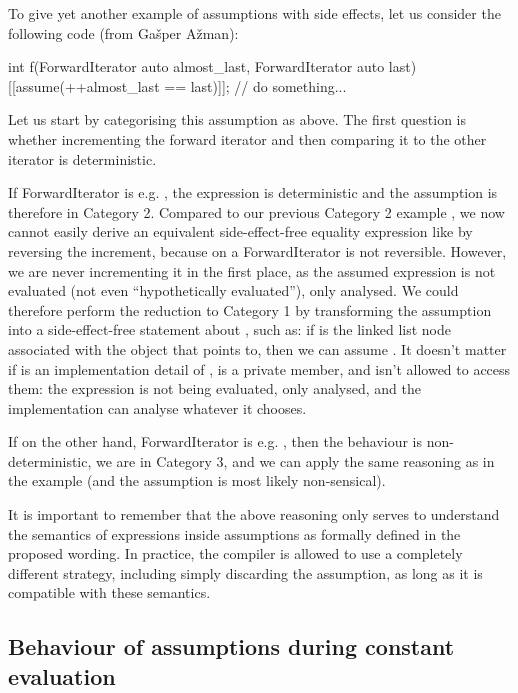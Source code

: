 To give yet another example of assumptions with side effects, let us consider the following code (from Ga\v sper A\v zman):

\begin{codeblock}
int f(ForwardIterator auto almost_last, ForwardIterator auto last) {
  [[assume(++almost_last == last)]];
  // do something...
}
\end{codeblock}

Let us start by categorising this assumption as above. The first question is whether incrementing the forward iterator and then comparing it to the other iterator is deterministic.

If ForwardIterator is e.g. , the expression is deterministic and the assumption is therefore in Category 2. Compared to our previous Category 2 example \tcode{[[assume(++i  == 43)]]}, we now cannot easily derive an equivalent side-effect-free equality expression like \tcode{[[assume(i == 42)]]} by reversing the increment, because  on a ForwardIterator is not reversible. However, we are never incrementing it in the first place, as the assumed expression is not evaluated (not even ``hypothetically evaluated''), only analysed. We could therefore perform the reduction to Category 1 by transforming the assumption into a side-effect-free statement about , such as: if  is the linked list node associated with the object that  points to, then we can assume . It doesn’t matter if  is an implementation detail of ,  is a private member, and  isn’t allowed to access them: the expression is not being evaluated, only analysed, and the implementation can analyse whatever it chooses.

If on the other hand, ForwardIterator is e.g. , then the behaviour is non-deterministic, we are in Category 3, and we can apply the same reasoning as in the  example (and the assumption is most likely non-sensical).

It is important to remember that the above reasoning only serves to understand the semantics of expressions inside assumptions as formally defined in the proposed wording. In practice, the compiler is allowed to use a completely different strategy, including simply discarding the assumption, as long as it is compatible with these semantics.

\subsection{Behaviour of assumptions during constant evaluation}

